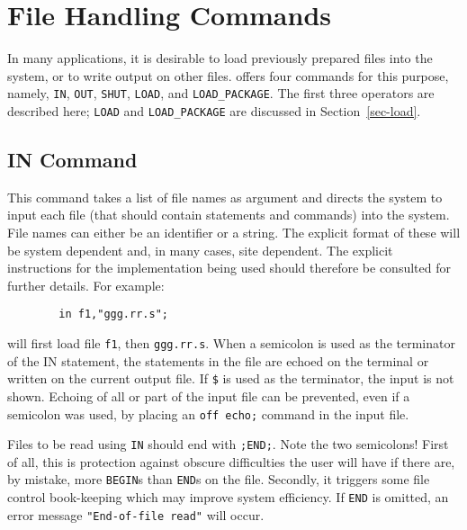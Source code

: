 \chapter{File Handling Commands}

In many applications, it is desirable to load previously prepared {\REDUCE}
files into the system, or to write output on other files. {\REDUCE} offers
four commands for this purpose, namely, \texttt{IN}, \texttt{OUT}, \texttt{SHUT},
\texttt{LOAD}, and \texttt{LOAD\_PACKAGE}.  The first
 three operators are described here; \texttt{LOAD} and 
\texttt{LOAD\_PACKAGE} are discussed in Section~\ref{sec-load}.

\section{IN Command}
\hypertarget{command:IN}{}
\hypertarget{switch:ECHO}{}
\hypertarget{reserved:_LINE_}{}
This command takes a list of file names as argument and directs the system
to input each file (that should contain {\REDUCE} statements
and commands) into the system.  File names can either be an identifier or
a string.  The explicit format of these will be system dependent and, in
many cases, site dependent.  The explicit instructions for the
implementation being used should therefore be consulted for further
details. For example:
\begin{verbatim}
        in f1,"ggg.rr.s";
\end{verbatim}
will first load file \texttt{f1}, then \texttt{ggg.rr.s}.  When a semicolon is
used as the terminator of the IN statement, the statements in the file are
echoed on the terminal or written on the current output file.  If \texttt{\$}
 is used as the terminator, the input is not
shown.  Echoing of all or part of the input file can be prevented, even if
a semicolon was used, by placing an \texttt{off echo;} command
in the input file.

Files to be read using \texttt{IN} should end with \texttt{;END;}.  Note the two
semicolons!  First of all, this is protection against obscure difficulties
the user will have if there are, by mistake, more \texttt{BEGIN}s than
\texttt{END}s on the file.  Secondly, it triggers some file control book-keeping
which may improve system efficiency.  If \texttt{END} is omitted, an error
message \texttt{"End-of-file read"} will occur.

